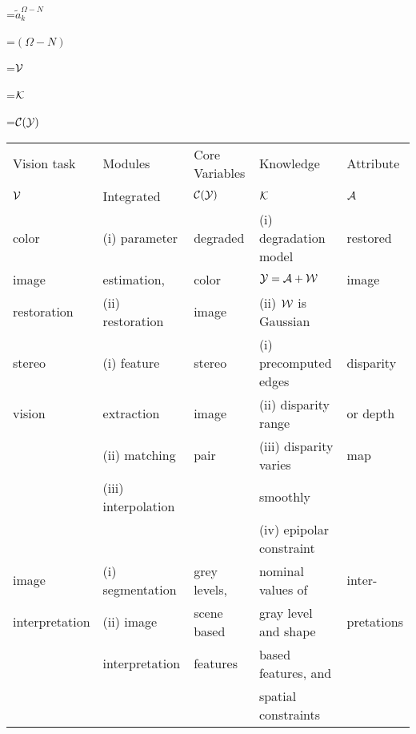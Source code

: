 {\newpage
\clearpage
\samepage \setbox\sizebox=\hbox{$\tilde{a}_k^{\Omega
 -N}$}\box\sizebox
}

{\newpage
\clearpage
\samepage \setbox\sizebox=\hbox{$(\Omega
 -N)$}\box\sizebox
}

{\newpage
\clearpage
\samepage \setbox\sizebox=\hbox{${\cal{V}}$}\box\sizebox
}

{\newpage
\clearpage
\samepage \setbox\sizebox=\hbox{${\cal{K}}$}\box\sizebox
}

{\newpage
\clearpage
\samepage \setbox\sizebox=\hbox{${\cal{C(Y)}}$}\box\sizebox
}

{\newpage
\clearpage
\samepage \begin{table}\begin{center}
 
\begin{tabular}{||l||l|l|l|l||} \hline \hline
Vision task & Modules  & Core Variables & Knowledge & Attribute  \\   
 ${\cal{V}}$            & Integrated & ${\cal{C(Y)}}$  &    ${\cal{K}}$       & ${\cal{A}}$ \\  \hline
color & (i) parameter  & degraded  & (i) degradation model& restored \\ 
image & estimation, & color & ${\cal{Y}}
  = {\cal{A}}
  + {\cal{W}}$& image\\ 
restoration & (ii) restoration &image & (ii) ${\cal{W}}$ is Gaussian & \\   \hline
stereo &(i) feature & stereo&(i) precomputed edges & disparity \\ 
vision &extraction  & image& (ii) disparity range & or depth\\ 
       & (ii) matching &  pair & (iii) disparity varies & map \\ 
       & (iii) interpolation&   & smoothly & \\ 
&  && (iv) epipolar constraint & \\  \hline
image& (i) segmentation        & grey levels,&  nominal values of   &
inter- \\ 
 interpretation &(ii) image      &scene based  &  gray level and shape&
pretations\\ 
              & interpretation &  features     & based features, and  & \\ 
& & & spatial constraints & \\ 
\hline \hline
\end{tabular}
\end{center}
 

\label{tab:sum_probs}
\end{table}
}

